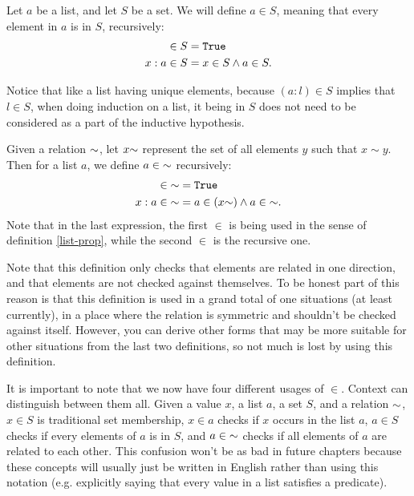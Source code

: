 \documentclass[../math.tex]{subfiles}
\begin{document}
\begin{definition} \label{list-prop}
    Let $a$ be a list, and let $S$ be a set.  We will define $a \in S$, meaning
    that every element in $a$ is in $S$, recursively:
    \begin{align*}
           [] \in S &= \vtt{True} \\
        x : a \in S &= x \in S \wedge a \in S.
    \end{align*}
\end{definition}
\noindent Notice that like a list having unique elements, because $(a : l) \in
S$ implies that $l \in S$, when doing induction on a list, it being in $S$ does
not need to be considered as a part of the inductive hypothesis.

\begin{definition}
    Given a relation ${\sim}$, let $x {\sim}$ represent the set of all elements
    $y$ such that $x \sim y$.  Then for a list $a$, we define $a \in {\sim}$
    recursively:
    \begin{align*}
           [] \in \usim &= \vtt{True} \\
        x : a \in \usim &= a \in (x \usim) \wedge a \in \usim.
    \end{align*}
    Note that in the last expression, the first $\in$ is being used in the sense
    of definition \ref{list-prop}, while the second $\in$ is the recursive one.
\end{definition}

Note that this definition only checks that elements are related in one
direction, and that elements are not checked against themselves.  To be honest
part of this reason is that this definition is used in a grand total of one
situations (at least currently), in a place where the relation is symmetric and
shouldn't be checked against itself.  However, you can derive other forms that
may be more suitable for other situations from the last two definitions, so not
much is lost by using this definition.

It is important to note that we now have four different usages of $\in$.
Context can distinguish between them all.  Given a value $x$, a list $a$, a set
$S$, and a relation ${\sim}$, $x \in S$ is traditional set membership, $x \in a$
checks if $x$ occurs in the list $a$, $a \in S$ checks if every elements of $a$
is in $S$, and $a \in {\sim}$ checks if all elements of $a$ are related to each
other.  This confusion won't be as bad in future chapters because these concepts
will usually just be written in English rather than using this notation (e.g.
explicitly saying that every value in a list satisfies a predicate).
\end{document}
